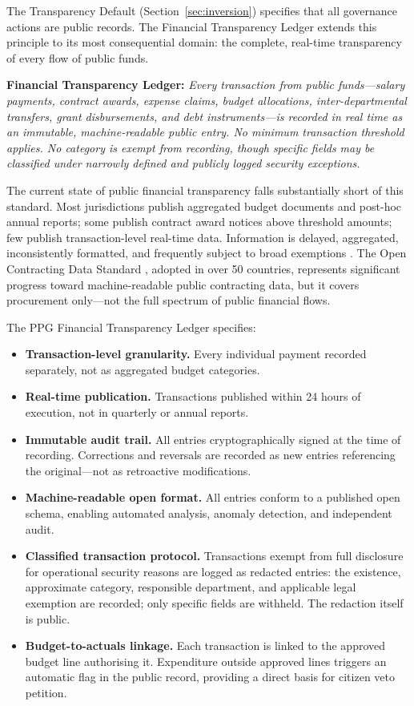 \documentclass[12pt,a4paper,oneside]{report}
\begin{document}
The Transparency Default (Section~\ref{sec:inversion}) specifies that all governance actions are public records. The Financial Transparency Ledger extends this principle to its most consequential domain: the complete, real-time transparency of every flow of public funds.

\begin{mdframed}
\textbf{Financial Transparency Ledger:} \textit{Every transaction from public funds---salary payments, contract awards, expense claims, budget allocations, inter-departmental transfers, grant disbursements, and debt instruments---is recorded in real time as an immutable, machine-readable public entry. No minimum transaction threshold applies. No category is exempt from recording, though specific fields may be classified under narrowly defined and publicly logged security exceptions.}
\end{mdframed}

The current state of public financial transparency falls substantially short of this standard. Most jurisdictions publish aggregated budget documents and post-hoc annual reports; some publish contract award notices above threshold amounts; few publish transaction-level real-time data. Information is delayed, aggregated, inconsistently formatted, and frequently subject to broad exemptions \citep{oecd2020open}. The Open Contracting Data Standard \citep{ocp2019ocds}, adopted in over 50 countries, represents significant progress toward machine-readable public contracting data, but it covers procurement only---not the full spectrum of public financial flows.

The PPG Financial Transparency Ledger specifies:

\begin{itemize}
  \item \textbf{Transaction-level granularity.} Every individual payment recorded separately, not as aggregated budget categories.
  \item \textbf{Real-time publication.} Transactions published within 24 hours of execution, not in quarterly or annual reports.
  \item \textbf{Immutable audit trail.} All entries cryptographically signed at the time of recording. Corrections and reversals are recorded as new entries referencing the original---not as retroactive modifications.
  \item \textbf{Machine-readable open format.} All entries conform to a published open schema, enabling automated analysis, anomaly detection, and independent audit.
  \item \textbf{Classified transaction protocol.} Transactions exempt from full disclosure for operational security reasons are logged as redacted entries: the existence, approximate category, responsible department, and applicable legal exemption are recorded; only specific fields are withheld. The redaction itself is public.
  \item \textbf{Budget-to-actuals linkage.} Each transaction is linked to the approved budget line authorising it. Expenditure outside approved lines triggers an automatic flag in the public record, providing a direct basis for citizen veto petition.
\end{itemize}
\end{document}
